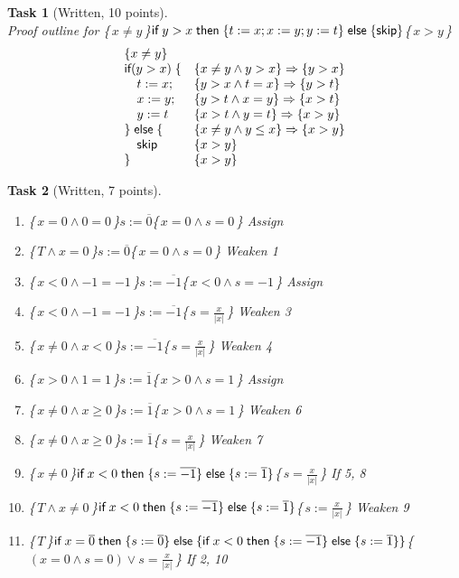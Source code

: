 \documentclass{article}
\newcommand{\stmt}[1]{\text{\sffamily #1}}
\newcommand{\ifs}[3]{\stmt{if}\;#1\;\stmt{then}\;\{#2\}\;\stmt{else}\;\{#3\}}
\newcommand{\skips}{\stmt{skip}}
\newcommand{\hoare}[3]{\{\,\ensuremath{#1}\,\}\;\ensuremath{#2}\;\{\,\ensuremath{#3}\,\}}
\theoremstyle{task}
\newtheorem{task}{Task}[section]
\begin{document}
\begin{task}[Written, 10 points]\ \\
    Proof outline for \hoare{x \neq y}{\ifs{y > x}{t := x; x := y; y := t}{\skips}}{x > y}
    \[
        \begin{array}{l l}
            \{x \neq y\} & \\
            \stmt{if} (y > x)\;\{ &\{x \neq y \wedge y > x\} \Rightarrow \{y > x\} \\
            \quad t := x; &\{y > x \wedge t = x\} \Rightarrow \{y > t\} \\
            \quad x := y; &\{y > t \wedge x = y\} \Rightarrow \{x > t\} \\
            \quad y := t &\{x > t \wedge y = t\} \Rightarrow \{x > y\} \\
            \}\;\stmt{else}\;\{ &\{x \neq y \wedge y \leq x\} \Rightarrow \{x > y\} \\
            \quad\skips &\{x > y\} \\
            \} &\{x > y\}
        \end{array}
    \]
\end{task}

\begin{task}[Written, 7 points]\
    \begin{enumerate}[1.]
        \item \hoare{x = 0 \wedge 0 = 0}{s := \overline{0}}{x = 0 \wedge s = 0} \quad Assign
        \item \hoare{T \wedge x = 0}{s := \overline{0}}{x = 0 \wedge s = 0} \quad Weaken 1
        \item \hoare{x < 0 \wedge -1 = -1}{s := \overline{-1}}{x < 0 \wedge s = -1} \quad Assign
        \item \hoare{x < 0 \wedge -1 = -1}{s := \overline{-1}}{s = \frac{x}{|x|}} \quad Weaken 3
        \item \hoare{x \neq 0 \wedge x < 0}{s := \overline{-1}}{s = \frac{x}{|x|}} \quad Weaken 4
        \item \hoare{x > 0 \wedge 1 = 1}{s := \overline{1}}{x > 0 \wedge s = 1} \quad Assign
        \item \hoare{x \neq 0 \wedge x \geq 0}{s := \overline{1}}{x > 0 \wedge s = 1} \quad Weaken 6
        \item \hoare{x \neq 0 \wedge x \geq 0}{s := \overline{1}}{s = \frac{x}{|x|}} \quad Weaken 7
        \item \hoare{x \neq 0}{\ifs{x < 0}{s := \overline{-1}}{s := \overline{1}}}{s = \frac{x}{|x|}} \quad If 5, 8
        \item \hoare{T \wedge x \neq 0}{\ifs{x < 0}{s := \overline{-1}}{s := \overline{1}}}{s := \frac{x}{|x|}} \quad Weaken 9
        \item \hoare{T}{\ifs{x = \overline{0}}{s := \overline{0}}{\ifs{x < 0}{s := \overline{-1}}{s := \overline{1}}}}{(x = 0 \wedge s = 0) \vee s = \frac{x}{|x|}}
            \quad If 2, 10
    \end{enumerate}
\end{task}
\end{document}
